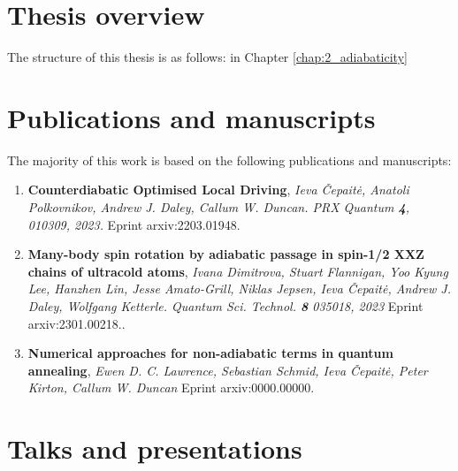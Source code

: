 \section{Thesis overview}

The structure of this thesis is as follows: in Chapter \ref{chap:2_adiabaticity}



\section{Publications and manuscripts}

The majority of this work is based on the following publications and manuscripts:

\begin{enumerate}
    \item \textbf{Counterdiabatic Optimised Local Driving}, \textit{Ieva Čepaitė, Anatoli Polkovnikov, Andrew J. Daley, Callum W. Duncan. PRX Quantum \textbf{4}, 010309, 2023.} Eprint arxiv:2203.01948. \cite{cepaite_counterdiabatic_2023}
    \item \textbf{Many-body spin rotation by adiabatic passage in
    spin-1/2 XXZ chains of ultracold atoms}, \textit{Ivana Dimitrova, Stuart Flannigan, Yoo Kyung Lee, Hanzhen Lin,  Jesse Amato-Grill, Niklas Jepsen, Ieva Čepaitė, Andrew J. Daley, Wolfgang Ketterle. Quantum Sci. Technol. \textbf{8} 035018, 2023} Eprint arxiv:2301.00218.\cite{dimitrova_many-body_2023}.
    \item \textbf{Numerical approaches for non-adiabatic terms in quantum annealing}, \textit{Ewen D. C. Lawrence, Sebastian Schmid, Ieva Čepaitė, Peter Kirton, Callum W. Duncan} Eprint arxiv:0000.00000.
\end{enumerate}

\section{Talks and presentations}

